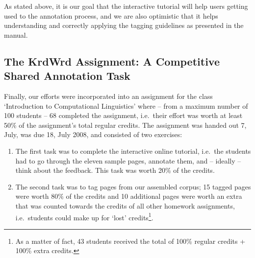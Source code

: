 \begin{longversion}
As stated above, it is our goal that the interactive tutorial will help users getting used to the annotation process, and we are also optimistic that it helps understanding and correctly applying the tagging guidelines as presented in the manual.



\subsection{\label{sec:assignment}The KrdWrd Assignment: A Competitive Shared Annotation Task}
Finally, our efforts were incorporated into an assignment for the class `Introduction to Computational Linguistics' where -- from a maximum number of 100 students -- 68 completed the assignment, i.e.~their effort was worth at least 50\% of the assignment's total regular credits.
The assignment was handed out 7, July, was due 18, July 2008, and consisted of two exercises:
\begin{enumerate}
        \item The first task was to complete the interactive online tutorial, i.e.~the students had to go through the eleven sample pages, annotate them, and -- ideally -- think about the feedback. This task was worth 20\% of the credits.
        \item The second task was to tag pages from our assembled corpus; 15 tagged pages were worth 80\% of the credits and 10 additional pages were worth an extra that was counted towards the credits of all other homework assignments, i.e.~students could make up for `lost' credits\footnote{As a matter of fact, 43 students received the total of 100\% regular credits + 100\% extra credits.}.
\end{enumerate}

%
%
\end{longversion}

